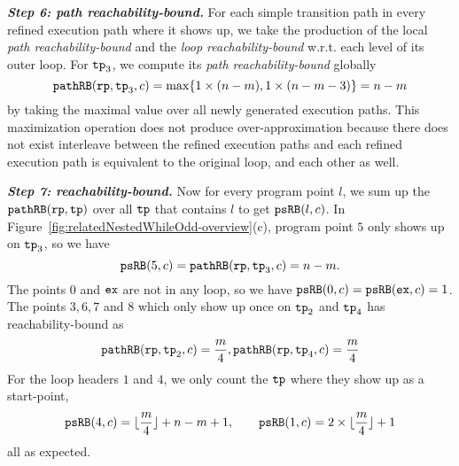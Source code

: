 \textbf{\emph{Step 6: path reachability-bound.}}
For each simple transition path in every refined execution path where it shows up, we take the production of the local \emph{path reachability-bound} and the  \emph{loop reachability-bound} w.r.t. each level of its outer loop.
For $\mathtt{tp}_3$,
we compute its \emph{path reachability-bound} globally
$$
\mathtt{pathRB}(\mathtt{rp}, \mathtt{tp}_3, c) = \max\{ 1 \times (n - m), 1 \times (n - m - 3) \} = n - m
$$
by
taking the maximal value over all newly generated execution paths.
This maximization operation does not produce over-approximation because there does not exist interleave
between the refined execution paths and each refined execution path is equivalent to the original loop, and each other as well.

\textbf{\emph{Step 7: reachability-bound.}}
Now for every program point $l$, we sum up the $\mathtt{pathRB}(\mathtt{rp}, \mathtt{tp})$ over all $\mathtt{tp}$ that contains $l$ to get $\mathtt{psRB}(l, c)$.
In Figure~\ref{fig:relatedNestedWhileOdd-overview}(c), program point $5$ only shows up on $\mathtt{tp}_3$, so we have
$$\mathtt{psRB}(5, c) = \mathtt{pathRB}(\mathtt{rp}, \mathtt{tp}_3, c) = n - m.$$
The points $0$ and $\mathtt{ex}$ are not in any loop, so we have $\mathtt{psRB}(0, c) = \mathtt{psRB}(\mathtt{ex}, c) = 1$.
The points $3, 6, 7$ and $8$ which only show up once on $\mathtt{tp}_2$ and $\mathtt{tp}_4$ has reachability-bound as
$$\mathtt{pathRB}(\mathtt{rp}, \mathtt{tp}_2, c) = \frac{m}{4}, \mathtt{pathRB}(\mathtt{rp}, \mathtt{tp}_4, c) = \frac{m}{4}$$
For the loop headers $1$ and $4$, we only count the $\mathtt{tp}$ where they show up as a start-point,
$$\mathtt{psRB}(4, c) = \lfloor\frac{m}{4}\rfloor + n - m + 1, \qquad \mathtt{psRB}(1,c) = 2 \times \lfloor\frac{m}{4}\rfloor + 1$$ 
all as expected.